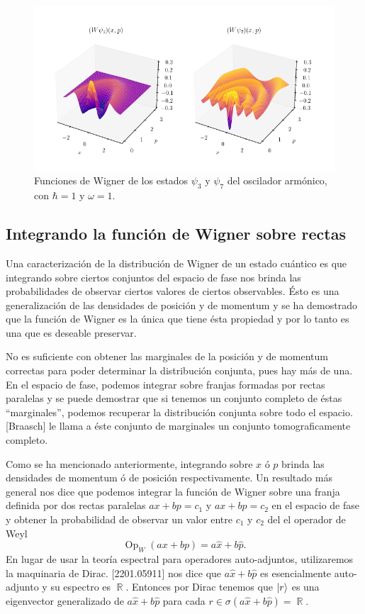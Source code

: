 \documentclass[a4paper]{report}
\DeclareMathOperator{\R}{\mathbb{R}}
\DeclareMathOperator{\Op}{Op}
\begin{document}
  \begin{figure}[ht]
    \centering
    \includegraphics[width=1\textwidth]{
      imgs/harmonic_osc_wigner.png
    }
    \caption{Funciones de Wigner de los estados $\psi_3$ y
    $\psi_7$ del oscilador armónico, con $\hbar = 1$ y
    $\omega = 1$.}
    \label{fig:harmonic_osc_wigner_3_7}
  \end{figure}

  \subsection{Integrando la función de Wigner sobre rectas}

  Una caracterización de la distribución de Wigner de un
  estado cuántico es que integrando sobre ciertos conjuntos
  del espacio de fase nos brinda las probabilidades de
  observar ciertos valores de ciertos observables. Ésto es
  una generalización de las densidades de posición y de
  momentum y se ha demostrado que la función de Wigner es la
  única que tiene ésta propiedad y por lo tanto es una que
  es deseable preservar.

  No es suficiente con obtener las marginales de la posición
  y de momentum correctas para poder determinar la
  distribución conjunta, pues hay más de una. En el espacio
  de fase, podemos integrar sobre franjas formadas por
  rectas paralelas y se puede demostrar que si tenemos un
  conjunto completo de éstas ``marginales'', podemos
  recuperar la distribución conjunta sobre todo el espacio.
  [Braasch] le llama a éste conjunto de marginales un
  conjunto tomograficamente completo.

  Como se ha mencionado anteriormente, integrando sobre $x$
  ó $p$ brinda las densidades de momentum ó de posición
  respectivamente. Un resultado más general nos dice que
  podemos integrar la función de Wigner sobre una franja
  definida por dos rectas paralelas $ax + bp = c_1$ y $ax +
  bp = c_2$ en el espacio de fase y obtener la probabilidad
  de observar un valor entre $c_1$ y $c_2$ del el operador
  de Weyl
  \[
    \Op_W(ax+bp) = a \hat{x} + b \hat{p}.
  \] 
  En lugar de usar la teoría espectral para operadores
  auto-adjuntos, utilizaremos la maquinaria de Dirac.
  [2201.05911] nos dice que $a \hat{x} + b \hat{p}$ es
  esencialmente auto-adjunto y su espectro es $\R$. Entonces
  por Dirac tenemos que $\ket r$ es una eigenvector
  generalizado de $a \hat{x} + b \hat{p}$ para cada $r \in
  \sigma\left( a \hat{x} + b \hat{p} \right) = \R$. 
\end{document}
